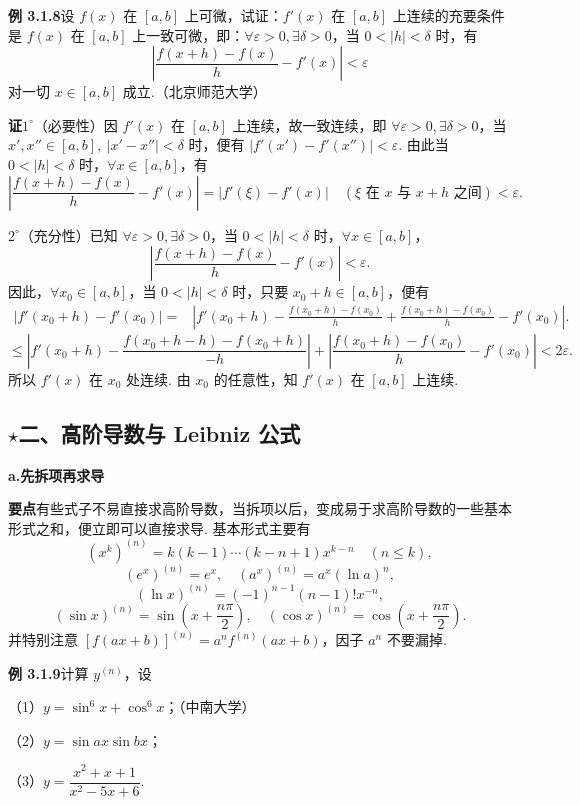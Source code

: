 \documentclass[UTF8,12pt,a4paper,fontset=fandol]{ctexart}
\begin{document}
\noindent\textbf{例 3.1.8}\quad 设 $f(x)$ 在 $[a,b]$ 上可微，试证：$f'(x)$ 在 $[a,b]$ 上连续的充要条件是 $f(x)$ 在 $[a,b]$ 上一致可微，即：$\forall\varepsilon>0,\exists\delta>0$，当 $0<|h|<\delta$ 时，有
\[
  \left|\frac{f(x+h)-f(x)}h-f'(x)\right|<\varepsilon
\]
对一切 $x\in[a,b]$ 成立.（北京师范大学）

\noindent\textbf{证}\quad $1^\circ$（必要性）因 $f'(x)$ 在 $[a,b]$ 上连续，故一致连续，即 $\forall\varepsilon>0,\exists\delta>0$，当 $x',x''\in[a,b],\ |x'-x''|<\delta$ 时，便有 $|f'(x')-f'(x'')|<\varepsilon$. 由此当 $0<|h|<\delta$ 时，$\forall x\in[a,b]$，有
\[
  \left|\frac{f(x+h)-f(x)}h-f'(x)\right|
  =|f'(\xi)-f'(x)|\quad(\xi\text{ 在 }x\text{ 与 }x+h\text{ 之间})
  <\varepsilon.
\]

$2^\circ$（充分性）已知 $\forall\varepsilon>0,\exists\delta>0$，当 $0<|h|<\delta$ 时，$\forall x\in[a,b]$，
\[
  \left|\frac{f(x+h)-f(x)}h-f'(x)\right|<\varepsilon.
\]
因此，$\forall x_0\in[a,b]$，当 $0<|h|<\delta$ 时，只要 $x_0+h\in[a,b]$，便有
\[
\begin{aligned}
|f'(x_0+h)-f'(x_0)|
=&\left|f'(x_0+h)-\frac{f(x_0+h)-f(x_0)}h
+\frac{f(x_0+h)-f(x_0)}h-f'(x_0)\right|.
\end{aligned}
\]
\[
\le\left|f'(x_0+h)-\frac{f(x_0+h-h)-f(x_0+h)}{-h}\right|
+\left|\frac{f(x_0+h)-f(x_0)}h-f'(x_0)\right|<2\varepsilon.
\]
所以 $f'(x)$ 在 $x_0$ 处连续. 由 $x_0$ 的任意性，知 $f'(x)$ 在 $[a,b]$ 上连续.

\subsection*{$\star$二、高阶导数与 Leibniz 公式}

\noindent\textbf{a.\quad 先拆项再求导}

\noindent\textbf{要点}\quad 有些式子不易直接求高阶导数，当拆项以后，变成易于求高阶导数的一些基本形式之和，便立即可以直接求导. 基本形式主要有
\[
  (x^k)^{(n)}=k(k-1)\cdots(k-n+1)x^{k-n}\quad(n\le k),
\]
\[
  (e^x)^{(n)}=e^x,\quad (a^x)^{(n)}=a^x(\ln a)^n,
\]
\[
  (\ln x)^{(n)}=(-1)^{n-1}(n-1)!x^{-n},
\]
\[
  (\sin x)^{(n)}=\sin\left(x+\frac{n\pi}2\right),\quad
  (\cos x)^{(n)}=\cos\left(x+\frac{n\pi}2\right).
\]
并特别注意 $[f(ax+b)]^{(n)}=a^n f^{(n)}(ax+b)$，因子 $a^n$ 不要漏掉.

\noindent\textbf{例 3.1.9}\quad 计算 $y^{(n)}$，设

（1）$y=\sin^6x+\cos^6x$；（中南大学）

（2）$y=\sin ax\sin bx$；

（3）$y=\dfrac{x^2+x+1}{x^2-5x+6}$.
\end{document}
